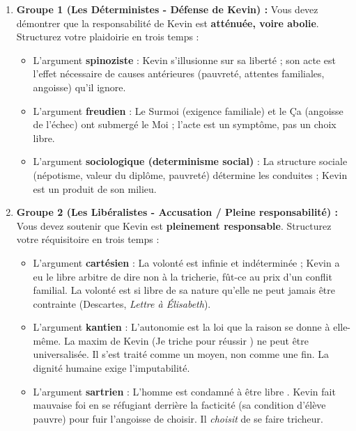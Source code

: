 \documentclass[11pt]{article}
\newcommand{\cle}[1]{{\popxbold\color{popdark}#1}}
\begin{document}
\begin{enumerate}
    \item \textbf{Groupe 1 (Les Déterministes - Défense de Kevin) :} Vous devez démontrer que la responsabilité de Kevin est \textbf{atténuée, voire abolie}. Structurez votre plaidoirie en trois temps :
    \begin{itemize}
        \item L'argument \textbf{spinoziste} : Kevin s'illusionne sur sa liberté ; son acte est l'effet nécessaire de causes antérieures (pauvreté, attentes familiales, angoisse) qu'il ignore.
        \item L'argument \textbf{freudien} : Le \cle{Surmoi} (exigence familiale) et le \cle{Ça} (angoisse de l'échec) ont submergé le \cle{Moi} ; l'acte est un symptôme, pas un choix libre.
        \item L'argument \textbf{sociologique (determinisme social)} : La structure sociale (népotisme, valeur du diplôme, pauvreté) détermine les conduites ; Kevin est un \guillemotleft produit \guillemotright de son milieu.
    \end{itemize}
    \item \textbf{Groupe 2 (Les Libéralistes - Accusation / Pleine responsabilité) :} Vous devez soutenir que Kevin est \textbf{pleinement responsable}. Structurez votre réquisitoire en trois temps :
    \begin{itemize}
        \item L'argument \textbf{cartésien} : La \cle{volonté} est infinie et indéterminée ; Kevin a eu le \cle{libre arbitre} de dire \guillemotleft non \guillemotright à la tricherie, fût-ce au prix d'un conflit familial. \guillemotleft La volonté est si libre de sa nature qu'elle ne peut jamais être contrainte \guillemotright (Descartes, \emph{Lettre à Élisabeth}).
        \item L'argument \textbf{kantien} : L'\cle{autonomie} est la loi que la raison se donne à elle-même. La \cle{maxim} de Kevin (\guillemotleft Je triche pour réussir \guillemotright) ne peut être universalisée. Il s'est traité comme un moyen, non comme une fin. La \cle{dignité} humaine exige l'imputabilité.
        \item L'argument \textbf{sartrien} : \guillemotleft L'homme est condamné à être libre \guillemotright. Kevin fait \cle{mauvaise foi} en se réfugiant derrière la \cle{facticité} (sa condition d'élève pauvre) pour fuir l'\cle{angoisse} de choisir. Il \emph{choisit} de se faire tricheur.
    \end{itemize}

\end{enumerate}
\end{document}
